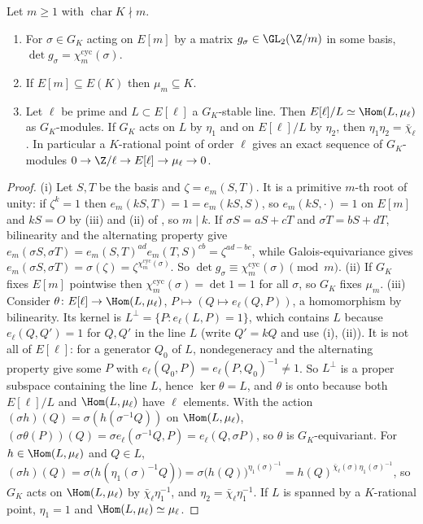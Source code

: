 \begin{corollary}\label{cor:ellcurves:det}
Let $m\ge1$ with $\operatorname{char}K\nmid m$.
\begin{enumerate}[label=(\roman*)]
\item For $\sigma\in G_K$ acting on $E[m]$ by a matrix $g_\sigma\in\GL_2(\Z/m)$ in some basis, $\det g_\sigma=\chi_m^{\mathrm{cyc}}(\sigma)$.
\item If $E[m]\subseteq E(K)$ then $\mu_m\subseteq K$.
\item Let $\ell$ be prime and $L\subset E[\ell]$ a $G_K$-stable line. Then $E[\ell]/L\simeq\Hom(L,\mu_\ell)$ as $G_K$-modules. If $G_K$ acts on $L$ by $\eta_1$ and on $E[\ell]/L$ by
$\eta_2$, then $\eta_1\eta_2=\bar\chi_\ell$. In particular a $K$-rational point of order $\ell$ gives an exact sequence of $G_K$-modules $0\to\Z/\ell\to E[\ell]\to\mu_\ell\to0$.
\end{enumerate}
\end{corollary}

\begin{proof}
(i) Let $S,T$ be the basis and $\zeta=e_m(S,T)$. It is a primitive $m$-th root of unity: if $\zeta^k=1$ then $e_m(kS,T)=1=e_m(kS,S)$, so $e_m(kS,\cdot)=1$ on $E[m]$ and
$kS=O$ by (iii) and (ii) of , so $m\mid k$. If $\sigma S=aS+cT$ and $\sigma T=bS+dT$, bilinearity and the alternating property give
$e_m(\sigma S,\sigma T)=e_m(S,T)^{ad}e_m(T,S)^{cb}=\zeta^{ad-bc}$, while Galois-equivariance gives $e_m(\sigma S,\sigma T)=\sigma(\zeta)=\zeta^{\chi_m^{\mathrm{cyc}}(\sigma)}$. So
$\det g_\sigma\equiv\chi_m^{\mathrm{cyc}}(\sigma)\pmod m$. (ii) If $G_K$ fixes $E[m]$ pointwise then $\chi_m^{\mathrm{cyc}}(\sigma)=\det1=1$ for all $\sigma$, so $G_K$ fixes $\mu_m$.
(iii) Consider $\theta\colon E[\ell]\to\Hom(L,\mu_\ell)$, $P\mapsto(Q\mapsto e_\ell(Q,P))$, a homomorphism by bilinearity. Its kernel is $L^\perp=\{P:e_\ell(L,P)=1\}$, which
contains $L$ because $e_\ell(Q,Q')=1$ for $Q,Q'$ in the line $L$ (write $Q'=kQ$ and use (i), (ii)). It is not all of $E[\ell]$: for a generator $Q_0$ of $L$,
nondegeneracy and the alternating property give some $P$ with $e_\ell(Q_0,P)=e_\ell(P,Q_0)^{-1}\ne1$. So $L^\perp$ is a proper subspace containing the line $L$, hence $\ker\theta=L$,
and $\theta$ is onto because both $E[\ell]/L$ and $\Hom(L,\mu_\ell)$ have $\ell$ elements. With the action $(\sigma h)(Q)=\sigma(h(\sigma^{-1}Q))$ on $\Hom(L,\mu_\ell)$,
$(\sigma\theta(P))(Q)=\sigma e_\ell(\sigma^{-1}Q,P)=e_\ell(Q,\sigma P)$, so $\theta$ is $G_K$-equivariant. For $h\in\Hom(L,\mu_\ell)$ and $Q\in L$,
$(\sigma h)(Q)=\sigma\bigl(h(\eta_1(\sigma)^{-1}Q)\bigr)=\sigma\bigl(h(Q)\bigr)^{\eta_1(\sigma)^{-1}}=h(Q)^{\bar\chi_\ell(\sigma)\eta_1(\sigma)^{-1}}$, so $G_K$ acts on
$\Hom(L,\mu_\ell)$ by $\bar\chi_\ell\eta_1^{-1}$, and $\eta_2=\bar\chi_\ell\eta_1^{-1}$. If
$L$ is spanned by a $K$-rational point, $\eta_1=1$ and $\Hom(L,\mu_\ell)\simeq\mu_\ell$.
\end{proof}

